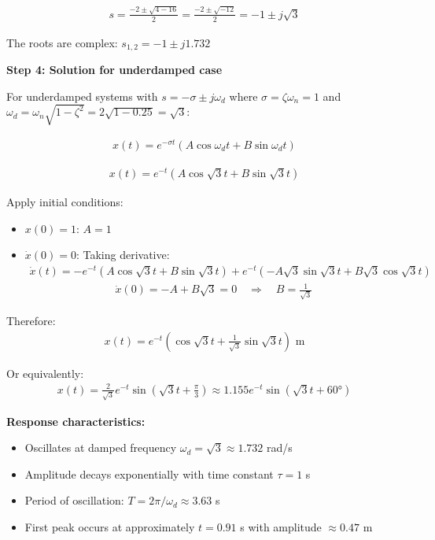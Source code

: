 \documentclass[11pt,a4paper]{article}
\begin{document}
\begin{align}
  s = \frac{-2 \pm \sqrt{4-16}}{2} = \frac{-2 \pm \sqrt{-12}}{2} = -1 \pm j\sqrt{3}
\end{align}

The roots are complex: $s_{1,2} = -1 \pm j1.732$

\textbf{Step 4: Solution for underdamped case}

For underdamped systems with $s = -\sigma \pm j\omega_d$ where $\sigma = \zeta\omega_n = 1$ and $\omega_d = \omega_n\sqrt{1-\zeta^2} = 2\sqrt{1-0.25} = \sqrt{3}$:

\begin{align}
  x(t) = e^{-\sigma t}(A\cos\omega_d t + B\sin\omega_d t)
\end{align}

\begin{align}
  x(t) = e^{-t}(A\cos\sqrt{3}t + B\sin\sqrt{3}t)
\end{align}

Apply initial conditions:
\begin{itemize}
  \item $x(0) = 1$: $A = 1$
  \item $\dot{x}(0) = 0$: Taking derivative:
    \begin{align}
      \dot{x}(t) = -e^{-t}(A\cos\sqrt{3}t + B\sin\sqrt{3}t) + e^{-t}(-A\sqrt{3}\sin\sqrt{3}t + B\sqrt{3}\cos\sqrt{3}t)
    \end{align}
    \begin{align}
      \dot{x}(0) = -A + B\sqrt{3} = 0 \quad \Rightarrow \quad B = \frac{1}{\sqrt{3}}
    \end{align}
\end{itemize}

Therefore:
\begin{align}
  x(t) = e^{-t}\left(\cos\sqrt{3}t + \frac{1}{\sqrt{3}}\sin\sqrt{3}t\right) \text{ m}
\end{align}

Or equivalently:
\begin{align}
  x(t) = \frac{2}{\sqrt{3}}e^{-t}\sin\left(\sqrt{3}t + \frac{\pi}{3}\right) \approx 1.155e^{-t}\sin(\sqrt{3}t + 60°)
\end{align}

\textbf{Response characteristics:}
\begin{itemize}
  \item Oscillates at damped frequency $\omega_d = \sqrt{3} \approx 1.732$ rad/s
  \item Amplitude decays exponentially with time constant $\tau = 1$ s
  \item Period of oscillation: $T = 2\pi/\omega_d \approx 3.63$ s
  \item First peak occurs at approximately $t = 0.91$ s with amplitude $\approx 0.47$ m
\end{itemize}
\end{document}
